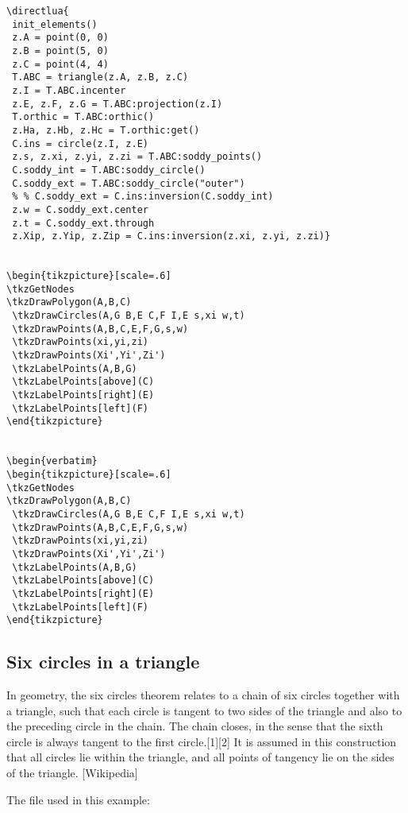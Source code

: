 \begin{verbatim}
\directlua{
 init_elements()
 z.A = point(0, 0)
 z.B = point(5, 0)
 z.C = point(4, 4)
 T.ABC = triangle(z.A, z.B, z.C)
 z.I = T.ABC.incenter
 z.E, z.F, z.G = T.ABC:projection(z.I)
 T.orthic = T.ABC:orthic()
 z.Ha, z.Hb, z.Hc = T.orthic:get()
 C.ins = circle(z.I, z.E)
 z.s, z.xi, z.yi, z.zi = T.ABC:soddy_points()
 C.soddy_int = T.ABC:soddy_circle()
 C.soddy_ext = T.ABC:soddy_circle("outer")
 % % C.soddy_ext = C.ins:inversion(C.soddy_int)
 z.w = C.soddy_ext.center
 z.t = C.soddy_ext.through
 z.Xip, z.Yip, z.Zip = C.ins:inversion(z.xi, z.yi, z.zi)}


\begin{tikzpicture}[scale=.6]
\tkzGetNodes
\tkzDrawPolygon(A,B,C)
 \tkzDrawCircles(A,G B,E C,F I,E s,xi w,t)
 \tkzDrawPoints(A,B,C,E,F,G,s,w)
 \tkzDrawPoints(xi,yi,zi)
 \tkzDrawPoints(Xi',Yi',Zi')
 \tkzLabelPoints(A,B,G)
 \tkzLabelPoints[above](C)
 \tkzLabelPoints[right](E)
 \tkzLabelPoints[left](F)
\end{tikzpicture}


\begin{verbatim}
\begin{tikzpicture}[scale=.6]
\tkzGetNodes
\tkzDrawPolygon(A,B,C)
 \tkzDrawCircles(A,G B,E C,F I,E s,xi w,t)
 \tkzDrawPoints(A,B,C,E,F,G,s,w)
 \tkzDrawPoints(xi,yi,zi)
 \tkzDrawPoints(Xi',Yi',Zi')
 \tkzLabelPoints(A,B,G)
 \tkzLabelPoints[above](C)
 \tkzLabelPoints[right](E)
 \tkzLabelPoints[left](F)
\end{tikzpicture}
\end{verbatim}

\subsection{Six circles in a triangle}
\label{sub:six_circles_in_a_triangle}
In geometry, the six circles theorem relates to a chain of six circles together with a triangle, such that each circle is tangent to two sides of the triangle and also to the preceding circle in the chain. The chain closes, in the sense that the sixth circle is always tangent to the first circle.[1][2] It is assumed in this construction that all circles lie within the triangle, and all points of tangency lie on the sides of the triangle. [Wikipedia]

\vspace{1em}
The file  used in this example:

